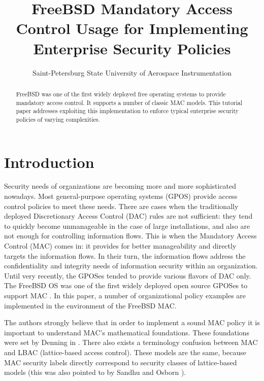 \documentclass[10pt,a4paper,conference,onecolumn]{IEEEtran}
\begin{document}


\title{FreeBSD Mandatory Access Control Usage for Implementing Enterprise Security Policies}

\author{
Saint-Petersburg State University of Aerospace Instrumentation
}

\maketitle

\begin{abstract}
FreeBSD was one of the first widely deployed free operating systems
to provide mandatory access control. It supports a number of classic
MAC models. This tutorial paper addresses exploiting this implementation
to enforce typical enterprise security policies of varying complexities.
\end{abstract}

\section{Introduction}
Security needs of organizations are becoming more and more 
sophisticated nowadays. Most general-purpose operating 
systems (GPOS) provide access control policies to meet 
these needs. There are cases when the traditionally deployed 
Discretionary Access Control (DAC) rules are not sufficient: 
they tend to quickly become unmanageable in the case of 
large installations, and also are not enough for
controlling information flows. This is when the Mandatory 
Access Control (MAC) comes in: it provides for better 
manageability and directly targets the information flows. 
In their turn, the information flows address the confidentiality and 
integrity needs of information security within an organization. 
Until very recently, the GPOSes tended to provide various 
flavors of DAC only. The FreeBSD OS \cite{KBER:FreeBSD} was one of the first 
widely deployed open source GPOSes to support MAC \cite{DBLP:conf/usenix/Watson01,DBLP:conf/usenix/WatsonMVF03}. 
In this paper, 
a number of organizational policy examples are implemented in
the environment of the FreeBSD MAC.

The authors
strongly believe that in order to implement a sound MAC policy
it is important to understand MAC's mathematical foundations.
These foundations were set by Denning in \cite{DBLP:journals/cacm/Denning76}.
There also exists a terminology confusion between MAC and LBAC 
(lattice-based access control). These models are the same, because
MAC security labels \cite{KBER:Orange85} directly correspond to
security classes of lattice-based models (this was also pointed to
by Sandhu \cite{DBLP:journals/computer/Sandhu93} and Osborn \cite{DBLP:conf/sacmat/Osborn02}).
\end{document}
